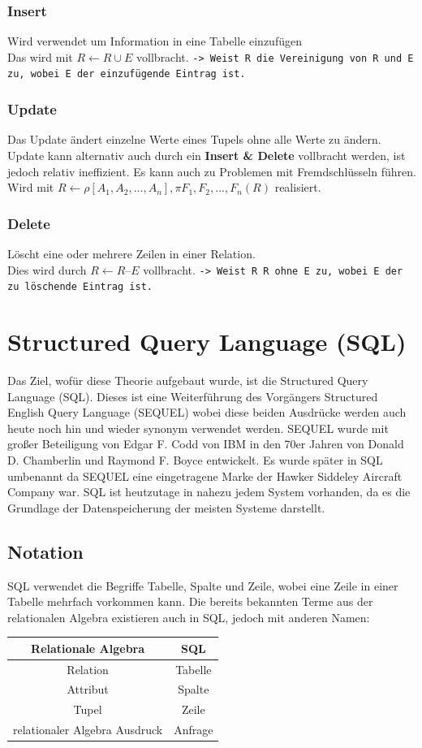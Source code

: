 \documentclass{article}
\begin{document}
 	\subsubsection{Insert}
 	Wird verwendet um Information in eine Tabelle einzufügen \\
 	Das wird mit $R \gets R \cup E$ vollbracht. \verb|-> Weist R die Vereinigung von R und E zu, wobei E der einzufügende Eintrag ist.|
 	\subsubsection{Update}
 	Das Update ändert einzelne Werte eines Tupels ohne alle Werte zu ändern. \\
 	Update kann alternativ auch durch ein \textbf{Insert \& Delete} vollbracht werden, ist jedoch relativ ineffizient. Es kann auch zu Problemen mit Fremdschlüsseln führen. \\
 	Wird mit $R \gets \rho[A_1,A_2,...,A_n], \pi F_1, F_2,...,F_n(R)$ realisiert. 
 	\subsubsection{Delete}
 	Löscht eine oder mehrere Zeilen in einer Relation. \\
 	Dies wird durch $R\gets R \text{--}E$ vollbracht. \verb|-> Weist R R ohne E zu, wobei E der zu löschende Eintrag ist.|
 	\section{Structured Query Language (SQL)}
 	Das Ziel, wofür diese Theorie aufgebaut wurde, ist die Structured Query Language (SQL). Dieses ist eine Weiterführung des Vorgängers Structured English Query Language (SEQUEL) wobei diese beiden Ausdrücke werden auch heute noch hin und wieder synonym verwendet werden. SEQUEL wurde mit großer Beteiligung von Edgar F. Codd von IBM in den 70er Jahren von Donald D. Chamberlin und Raymond F. Boyce entwickelt. Es wurde später in SQL umbenannt da SEQUEL eine eingetragene Marke der Hawker Siddeley Aircraft Company war. SQL ist heutzutage in nahezu jedem System vorhanden, da es die Grundlage der Datenspeicherung der meisten Systeme darstellt.
 	\subsection{Notation}
 	SQL verwendet die Begriffe Tabelle, Spalte und Zeile, wobei eine Zeile in einer Tabelle mehrfach vorkommen kann. Die bereits bekannten Terme aus der relationalen Algebra existieren auch in SQL, jedoch mit anderen Namen:\\
 	\begin{tabular}{| c | c |}
 		\toprule
 		Relationale Algebra & SQL \\ \midrule
 		Relation & Tabelle \\ \hline
 		Attribut & Spalte \\ \hline
 		Tupel & Zeile \\ \hline
 		relationaler Algebra Ausdruck & Anfrage \\
 		\bottomrule
 	\end{tabular} \\
\end{document}
